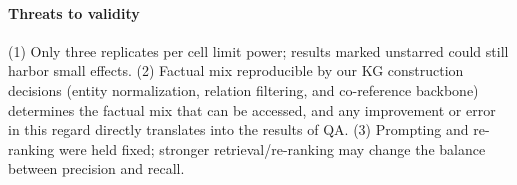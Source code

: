 \paragraph{Threats to validity}
(1) Only three replicates per cell limit power; results marked unstarred could still harbor small effects. (2)  Factual mix reproducible by our KG construction decisions (entity normalization, relation filtering, and co-reference backbone) determines the factual mix that can be accessed, and any improvement or error in this regard directly translates into the results of QA. (3) Prompting and re-ranking were held fixed; stronger retrieval/re-ranking may change the balance between precision and recall.
